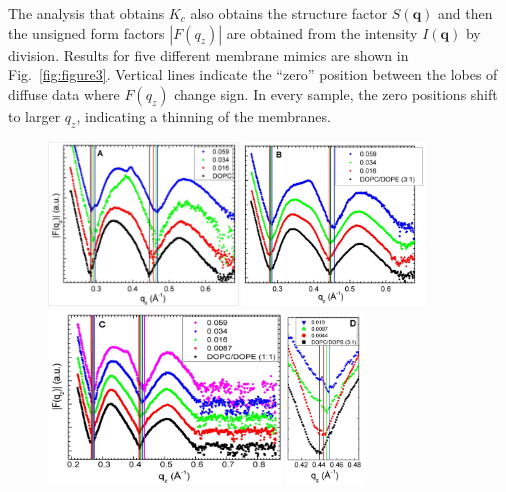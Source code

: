 The analysis that obtains $K_c$ also obtains the structure factor $S(\mathbf{q})$ 
and then the unsigned form factors $|F(q_z)|$ are obtained from the intensity $I(\mathbf{q})$ by division. 
Results for five different membrane mimics are shown in Fig.~\ref{fig:figure3}. 
Vertical lines indicate the “zero” position between the lobes of diffuse data 
where $F(q_z)$ change sign. In every sample, the zero positions shift to larger
$q_z$, indicating a thinning of the membranes.

\begin{figure}[htbp]
  \centering
  \includegraphics[width=0.45\textwidth]{figures/Tat/figure3a}
  \includegraphics[width=0.43\textwidth]{figures/Tat/figure3b}
  \includegraphics[width=0.55\textwidth]{figures/Tat/figure3c}
  \includegraphics[width=0.19\textwidth]{figures/Tat/figure3d}

\end{figure}
